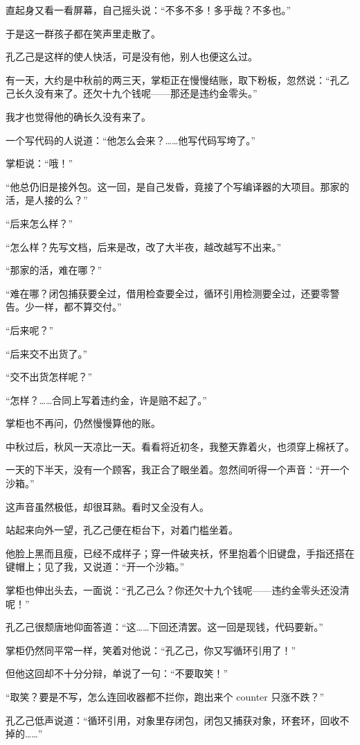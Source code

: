 直起身又看一看屏幕，自己摇头说：“不多不多！多乎哉？不多也。”

于是这一群孩子都在笑声里走散了。

孔乙己是这样的使人快活，可是没有他，别人也便这么过。

有一天，大约是中秋前的两三天，掌柜正在慢慢结账，取下粉板，忽然说：“孔乙己长久没有来了。还欠十九个钱呢——那还是违约金零头。”

我才也觉得他的确长久没有来了。

一个写代码的人说道：“他怎么会来？……他写代码写垮了。”

掌柜说：“哦！”

“他总仍旧是接外包。这一回，是自己发昏，竟接了个写编译器的大项目。那家的活，是人接的么？”

“后来怎么样？”

“怎么样？先写文档，后来是改，改了大半夜，越改越写不出来。”

“那家的活，难在哪？”

“难在哪？闭包捕获要全过，借用检查要全过，循环引用检测要全过，还要零警告。少一样，都不算交付。”

“后来呢？”

“后来交不出货了。”

“交不出货怎样呢？”

“怎样？……合同上写着违约金，许是赔不起了。”

掌柜也不再问，仍然慢慢算他的账。

中秋过后，秋风一天凉比一天。看看将近初冬，我整天靠着火，也须穿上棉袄了。

一天的下半天，没有一个顾客，我正合了眼坐着。忽然间听得一个声音：“开一个沙箱。”

这声音虽然极低，却很耳熟。看时又全没有人。

站起来向外一望，孔乙己便在柜台下，对着门槛坐着。

他脸上黑而且瘦，已经不成样子；穿一件破夹袄，怀里抱着个旧键盘，手指还搭在键帽上；见了我，又说道：“开一个沙箱。”

掌柜也伸出头去，一面说：“孔乙己么？你还欠十九个钱呢——违约金零头还没清呢！”

孔乙己很颓唐地仰面答道：“这……下回还清罢。这一回是现钱，代码要新。”

掌柜仍然同平常一样，笑着对他说：“孔乙己，你又写循环引用了！”

但他这回却不十分分辩，单说了一句：“不要取笑！”

“取笑？要是不写，怎么连回收器都不拦你，跑出来个 counter 只涨不跌？”

孔乙己低声说道：“循环引用，对象里存闭包，闭包又捕获对象，环套环，回收不掉的……”

